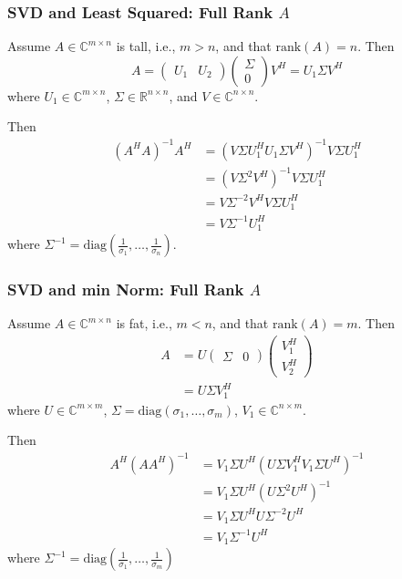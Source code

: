 \documentclass{beamer}
\begin{document}
\begin{frame}\frametitle{SVD and Least Squared: Full Rank $A$}
	Assume $A\in\mathbb{C}^{m\times n}$ is tall, i.e.,  $m > n$, and that 
	$\text{rank}(A) = n$.  Then
	\[
		A = 
			\begin{pmatrix}
				U_1 & U_2	
			\end{pmatrix}
			\begin{pmatrix}
				\Sigma \\ 0	
			\end{pmatrix}
			V^H
		= U_1 \Sigma V^H
	\]
	where $U_1\in\mathbb{C}^{m\times n}$, $\Sigma \in \mathbb{R}^{n\times n}$, and $V\in\mathbb{C}^{n\times n}$.
	
	\vfill
	
	Then
	\begin{align*}
		(A^HA)^{-1}A^H 
			&= (V\Sigma U_1^HU_1\Sigma V^H)^{-1}V\Sigma U_1^H\\
			&= (V\Sigma^2V^H)^{-1}V\Sigma U_1^H\\
			&= V\Sigma^{-2}V^HV\Sigma U_1^H\\
			&= V\Sigma^{-1}U_1^H
	\end{align*}
	where $\Sigma^{-1} = \text{diag}(\frac{1}{\sigma_1}, \dots, \frac{1}{\sigma_n})$.	
\end{frame}

\begin{frame}\frametitle{SVD and min Norm: Full Rank $A$}
	Assume $A\in\mathbb{C}^{m\times n}$ is fat, i.e.,  $m < n$, and that $\text{rank}(A) = m$.  Then
	\begin{align*}
		A &= U \begin{pmatrix}
		      		\Sigma & 0
		    	\end{pmatrix}
		    	\begin{pmatrix}
		  			V_1^H\\
		  			V_2^H
				\end{pmatrix} \\ 
		&= U\Sigma V_1^H				
	\end{align*}
	where $U\in\mathbb{C}^{m\times m}$, 
	$\Sigma=\text{diag}(\sigma_1, \dots, \sigma_m)$, 
	$V_1 \in \mathbb{C}^{n\times m}$.
	
	\vfill
	
	Then 
	\begin{align*}
		A^H (A A^H)^{-1} 
			&= V_1 \Sigma U^H(U\Sigma V_1^HV_1\Sigma U^H)^{-1}\\
			&= V_1 \Sigma U^H(U\Sigma^2U^H)^{-1}\\
			&= V_1 \Sigma U^HU\Sigma^{-2}U^H\\
			&= V_1 \Sigma^{-1}U^H
	\end{align*}
	where $\Sigma^{-1} = \text{diag}(\frac{1}{\sigma_1}, \dots, \frac{1}{\sigma_m})$
\end{frame}
\end{document}
